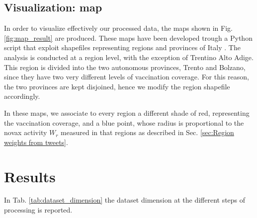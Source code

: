 \documentclass[prb,twocolumn,9pt]{revtex4-1}
\begin{document}
\subsection{Visualization: map}
\label{sec:Visualization:map}
In order to visualize effectively our processed data, the maps shown in Fig. \ref{fig:map_result} are produced. These maps have been developed trough a Python script that exploit shapefiles representing regions and provinces of Italy \cite{istat}.
The analysis is conducted at a region level, with the exception of Trentino Alto Adige. This region is divided into the two autonomous provinces, Trento and Bolzano, since they have two very different levels of vaccination coverage. For this reason, the two provinces are kept disjoined, hence we modify the region shapefile accordingly.

In these maps, we associate to every region a different shade of red, representing the vaccination coverage, and a blue point, whose radius is proportional to the novax activity $W_r$ measured in that regions as described in Sec. \ref{sec:Region weights from tweets}.


\section{Results}
\label{sec:results}

In Tab. \ref{tab:dataset_dimension} the dataset dimension at the different steps of processing is reported.
\end{document}
